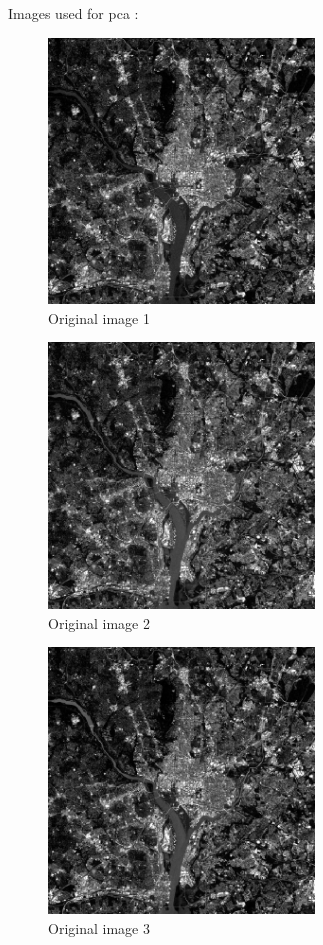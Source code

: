 \documentclass[10pt]{article}
\begin{document}
Images used for pca :
\begin{figure}[!ht]
	\centering
	\includegraphics[height=200pt]{./ex10/WashingtonDC_Band1.jpg}
	\caption{Original image 1}
\end{figure}
\begin{figure}[!ht]
	\centering
	\includegraphics[height=200pt]{./ex10/WashingtonDC_Band2.jpg}
	\caption{Original image 2}
\end{figure}
\begin{figure}[!ht]
	\centering
	\includegraphics[height=200pt]{./ex10/WashingtonDC_Band3.jpg}
	\caption{Original image 3}
\end{figure}
\end{document}
